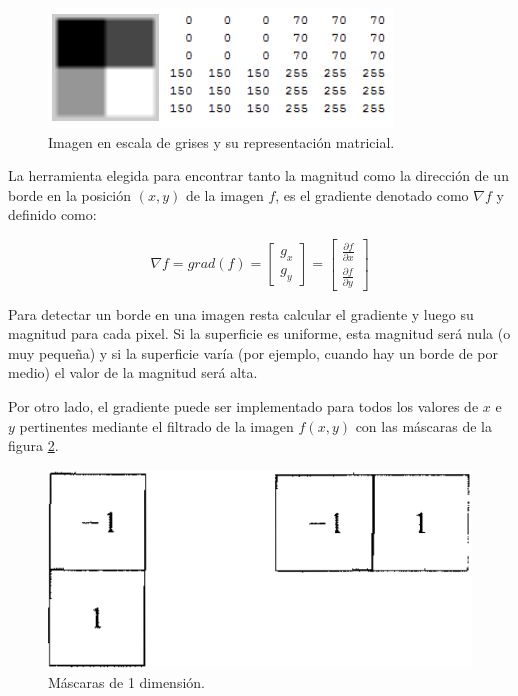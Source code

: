 \begin{figure}[hbt]
\begin{center}
\includegraphics[scale=0.8]{img/02_escala_grises.jpg}
\end{center}
\caption{Imagen en escala de grises y su representación matricial.}
\label{gonz2}
\end{figure}

La herramienta elegida para encontrar tanto la magnitud como la dirección de un borde en la posición $(x,y)$ de la imagen $f$, es el gradiente denotado como ${\nabla}f$ y definido como:

 \begin{equation}
{\nabla}f = grad(f) = \begin{bmatrix}
            {g_x} \\[0.3em]
            {g_y}
            \end{bmatrix} = \begin{bmatrix}
                    {\frac{{\partial}f}{{\partial}x}} \\[0.3em]
                    {\frac{{\partial}f}{{\partial}y}}
                      \end{bmatrix}
 \end{equation}

Para detectar un borde en una imagen resta calcular el gradiente y luego su magnitud para cada pixel. Si la superficie es uniforme, esta magnitud será nula (o muy pequeña) y si la superficie varía (por ejemplo, cuando hay un borde de por medio) el valor de la magnitud será alta.

Por otro lado, el gradiente puede ser implementado para todos los valores de $x$ e $y$ pertinentes mediante el filtrado de la imagen $f(x,y)$ con las máscaras de la figura \ref{matrix1d}.

\begin{figure}[H]
\begin{center}
\includegraphics[scale=0.3]{img/matriz1d.png}
\end{center}
\caption{Máscaras de 1 dimensión.}
\label{matrix1d}
\end{figure}

